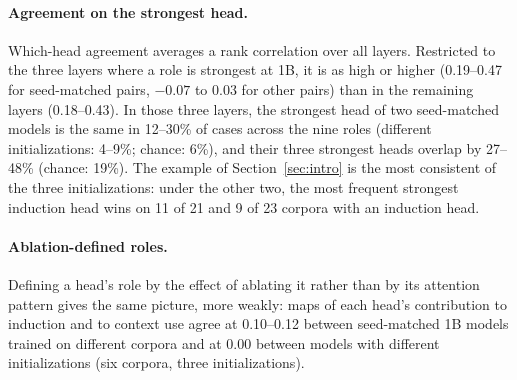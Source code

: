 \documentclass[11pt]{article}
\begin{document}
\paragraph{Agreement on the strongest head.}
Which-head agreement averages a rank correlation over all layers.
Restricted to the three layers where a role is strongest at 1B, it is as high or higher (0.19--0.47 for seed-matched pairs, $-0.07$ to $0.03$ for other pairs) than in the remaining layers (0.18--0.43).
In those three layers, the strongest head of two seed-matched models is the same in 12--30\% of cases across the nine roles (different initializations: 4--9\%; chance: 6\%), and their three strongest heads overlap by 27--48\% (chance: 19\%).
The example of Section~\ref{sec:intro} is the most consistent of the three initializations: under the other two, the most frequent strongest induction head wins on 11 of 21 and 9 of 23 corpora with an induction head.

\paragraph{Ablation-defined roles.}
Defining a head's role by the effect of ablating it rather than by its attention pattern gives the same picture, more weakly: maps of each head's contribution to induction and to context use agree at 0.10--0.12 between seed-matched 1B models trained on different corpora and at 0.00 between models with different initializations (six corpora, three initializations).
\end{document}

